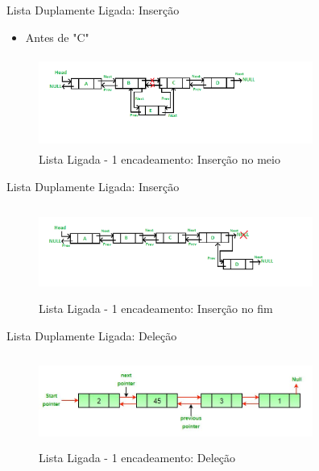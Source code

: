 \begin{frame}
	\begin{block}{Lista Duplamente Ligada: Inserção}
	\begin{itemize}
			\item Antes de "C"
	\end{itemize}
		\begin{figure}[!htb]
			\centering	  				
			\includegraphics[height=3cm, width = 9cm]{./pic/DLL_add_middle1.png}
			\caption{Lista Ligada - 1 encadeamento: Inserção no meio \cite{GEEKS_2018}}
			\label{fig_LDE_midle2}
		\end{figure}
	\end{block}
\end{frame}


\begin{frame}
	\begin{block}{Lista Duplamente Ligada: Inserção}
		\begin{figure}[!htb]
			\centering	  				
			\includegraphics[height=3cm, width = 9cm]{./pic/DLL_add_end1.png}
			\caption{Lista Ligada - 1 encadeamento: Inserção no fim \cite{GEEKS_2018}}
			\label{fig_LDE_end}
		\end{figure}
	\end{block}
\end{frame}



\begin{frame}
	\begin{block}{Lista Duplamente Ligada: Deleção}
		\begin{figure}[!htb]
			\centering	  				
			\includegraphics[height=3cm, width = 9cm]{./pic/Delete_lincked_list.jpg}
			\caption{Lista Ligada - 1 encadeamento: Deleção \cite{GEEKS_2018}}
			\label{fig_LDE_end}
		\end{figure}
	\end{block}
\end{frame}



